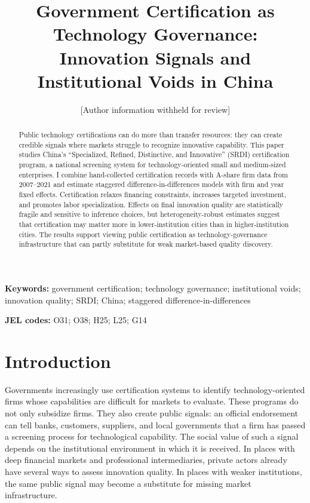\documentclass[12pt]{article}
\title{Government Certification as Technology Governance:\\ Innovation Signals and Institutional Voids in China}
\author{[Author information withheld for review]}
\date{}
\begin{document}
\maketitle

\begin{abstract}
Public technology certifications can do more than transfer resources: they can create credible signals where markets struggle to recognize innovative capability. This paper studies China's ``Specialized, Refined, Distinctive, and Innovative'' (SRDI) certification program, a national screening system for technology-oriented small and medium-sized enterprises. I combine hand-collected certification records with A-share firm data from 2007--2021 and estimate staggered difference-in-differences models with firm and year fixed effects. Certification relaxes financing constraints, increases targeted investment, and promotes labor specialization. Effects on final innovation quality are statistically fragile and sensitive to inference choices, but heterogeneity-robust estimates suggest that certification may matter more in lower-institution cities than in higher-institution cities. The results support viewing public certification as technology-governance infrastructure that can partly substitute for weak market-based quality discovery.
\end{abstract}

\noindent\textbf{Keywords:} government certification; technology governance; institutional voids; innovation quality; SRDI; China; staggered difference-in-differences

\noindent\textbf{JEL codes:} O31; O38; H25; L25; G14

\section{Introduction}

Governments increasingly use certification systems to identify technology-oriented firms whose capabilities are difficult for markets to evaluate. These programs do not only subsidize firms. They also create public signals: an official endorsement can tell banks, customers, suppliers, and local governments that a firm has passed a screening process for technological capability. The social value of such a signal depends on the institutional environment in which it is received. In places with deep financial markets and professional intermediaries, private actors already have several ways to assess innovation quality. In places with weaker institutions, the same public signal may become a substitute for missing market infrastructure.
\end{document}
